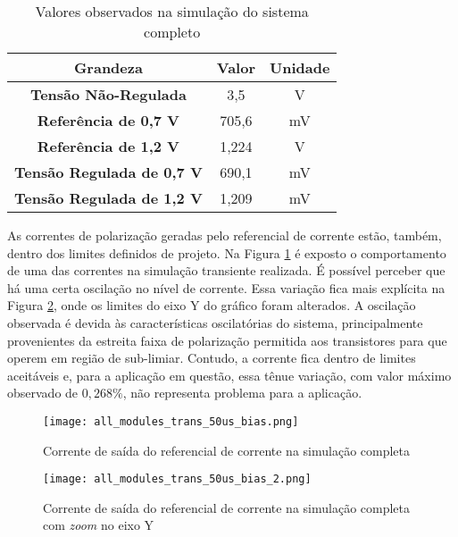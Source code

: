 \begin{table}[!htb]
	\centering
	\caption{\label{tab:all_modules_trans_50us}Valores observados na simulação do sistema completo}
	\begin{tabular}{c|cc}
		\textbf{Grandeza} & \textbf{Valor} & \textbf{Unidade} \\
		\hline
		\textbf{Tensão Não-Regulada} & 3,5 & V \\
		\textbf{Referência de 0,7 V} & 705,6 & mV \\
		\textbf{Referência de 1,2 V} & 1,224 & V \\
		\textbf{Tensão Regulada de 0,7 V} & 690,1 & mV \\
		\textbf{Tensão Regulada de 1,2 V} & 1,209 & mV \\
	\end{tabular}
\end{table}

As correntes de polarização geradas pelo referencial de corrente estão, também, dentro dos limites definidos de projeto. Na Figura \ref{fig:all_modules_trans_50us_bias} é exposto o comportamento de uma das correntes na simulação transiente realizada. É possível perceber que há uma certa oscilação no nível de corrente. Essa variação fica mais explícita na Figura \ref{fig:all_modules_trans_50us_bias_2}, onde os limites do eixo Y do gráfico foram alterados. A oscilação observada é devida às características oscilatórias do sistema, principalmente provenientes da estreita faixa de polarização permitida aos transistores para que operem em região de sub-limiar. Contudo, a corrente fica dentro de limites aceitáveis e, para a aplicação em questão, essa tênue variação, com valor máximo observado de $0,268\%$, não representa problema para a aplicação.

\begin{figure}[!htb]
	\caption{\label{fig:all_modules_trans_50us_bias}Corrente de saída do referencial de corrente na simulação completa}
	\begin{center}
		\texttt{[image: all\_modules\_trans\_50us\_bias.png]}
	\end{center}
\end{figure}

\begin{figure}[!htb]
	\caption{\label{fig:all_modules_trans_50us_bias_2}Corrente de saída do referencial de corrente na simulação completa com \textit{zoom} no eixo Y}
	\begin{center}
		\texttt{[image: all\_modules\_trans\_50us\_bias\_2.png]}
	\end{center}
\end{figure}

